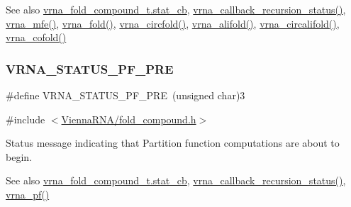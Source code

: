 \begin{DoxySeeAlso}{See also}
\mbox{\hyperlink{group__fold__compound_a87a83f6795b569000efcbe65acc3dd81}{vrna\+\_\+fold\+\_\+compound\+\_\+t.\+stat\+\_\+cb}}, \mbox{\hyperlink{group__fold__compound_gac86036fa8cad1108832335063243cdc8}{vrna\+\_\+callback\+\_\+recursion\+\_\+status()}}, \mbox{\hyperlink{group__mfe__fold_gabd3b147371ccf25c577f88bbbaf159fd}{vrna\+\_\+mfe()}}, \mbox{\hyperlink{group__mfe__fold__single_ga29a33b2895f4e67b0480271ff289afdc}{vrna\+\_\+fold()}}, \mbox{\hyperlink{group__mfe__fold__single_gaf973483d8acbc8cc9aacfc8a9b7f0074}{vrna\+\_\+circfold()}}, \mbox{\hyperlink{group__consensus__mfe__fold_ga6c9d3bef3e92c6d423ffac9f981418c1}{vrna\+\_\+alifold()}}, \mbox{\hyperlink{group__consensus__mfe__fold_ga17a1be7490468c29c335ba9bffacba53}{vrna\+\_\+circalifold()}}, \mbox{\hyperlink{group__mfe__cofold_ga9ef3a297201dbf838a8daff2b45c0c82}{vrna\+\_\+cofold()}} 
\end{DoxySeeAlso}
\mbox{\label{group__fold__compound_ga91795d35ebdb6f32be50459f24b3d114}} 
\subsubsection{\texorpdfstring{V\+R\+N\+A\+\_\+\+S\+T\+A\+T\+U\+S\+\_\+\+P\+F\+\_\+\+P\+RE}{VRNA\_STATUS\_PF\_PRE}}
{\footnotesize\ttfamily \#define V\+R\+N\+A\+\_\+\+S\+T\+A\+T\+U\+S\+\_\+\+P\+F\+\_\+\+P\+RE~(unsigned char)3}



{\ttfamily \#include $<$\mbox{\hyperlink{fold__compound_8h}{Vienna\+R\+N\+A/fold\+\_\+compound.\+h}}$>$}



Status message indicating that Partition function computations are about to begin. 

\begin{DoxySeeAlso}{See also}
\mbox{\hyperlink{group__fold__compound_a87a83f6795b569000efcbe65acc3dd81}{vrna\+\_\+fold\+\_\+compound\+\_\+t.\+stat\+\_\+cb}}, \mbox{\hyperlink{group__fold__compound_gac86036fa8cad1108832335063243cdc8}{vrna\+\_\+callback\+\_\+recursion\+\_\+status()}}, \mbox{\hyperlink{group__pf__fold_ga29e256d688ad221b78d37f427e0e99bc}{vrna\+\_\+pf()}} 
\end{DoxySeeAlso}
\mbox{\label{group__fold__compound_ga1c6fa243533fd026e50f7d595eaaa565}} 

